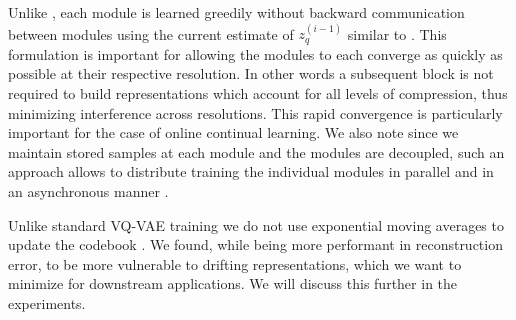 \documentclass[colorinlistoftodos]{article} %
\begin{document}
Unlike \cite{}, each module is learned greedily without backward communication between modules using the current estimate of $z_q^{(i-1)}$ similar to \cite{belilovsky2019decoupled,nokland2019training}. This formulation is important for allowing the modules to each converge as quickly as possible at their respective resolution. In other words a subsequent block is not required to build representations which account for all levels of compression, thus minimizing interference across resolutions. This rapid convergence is particularly important for the case of online continual learning.  We also note since we maintain stored samples at each module and the modules are decoupled, such an approach allows to distribute training the individual modules in parallel and in an asynchronous manner \cite{belilovsky2019decoupled}.

Unlike standard VQ-VAE training we do not use  exponential moving averages to update the codebook \citep{}. We found, while being more performant in reconstruction error, to be more vulnerable to drifting representations, which we want to minimize for downstream applications. We will discuss this further in the experiments. 
\end{document}
